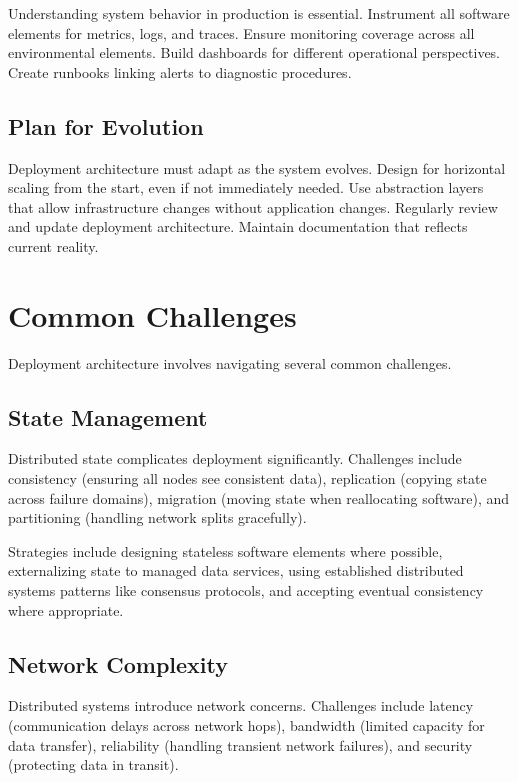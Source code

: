 \documentclass[11pt]{article}
\begin{document}
Understanding system behavior in production is essential. Instrument all software elements for metrics, logs, and traces. Ensure monitoring coverage across all environmental elements. Build dashboards for different operational perspectives. Create runbooks linking alerts to diagnostic procedures.

\subsection{Plan for Evolution}

Deployment architecture must adapt as the system evolves. Design for horizontal scaling from the start, even if not immediately needed. Use abstraction layers that allow infrastructure changes without application changes. Regularly review and update deployment architecture. Maintain documentation that reflects current reality.

\section{Common Challenges}

Deployment architecture involves navigating several common challenges.

\subsection{State Management}

Distributed state complicates deployment significantly. Challenges include consistency (ensuring all nodes see consistent data), replication (copying state across failure domains), migration (moving state when reallocating software), and partitioning (handling network splits gracefully).

Strategies include designing stateless software elements where possible, externalizing state to managed data services, using established distributed systems patterns like consensus protocols, and accepting eventual consistency where appropriate.

\subsection{Network Complexity}

Distributed systems introduce network concerns. Challenges include latency (communication delays across network hops), bandwidth (limited capacity for data transfer), reliability (handling transient network failures), and security (protecting data in transit).
\end{document}
